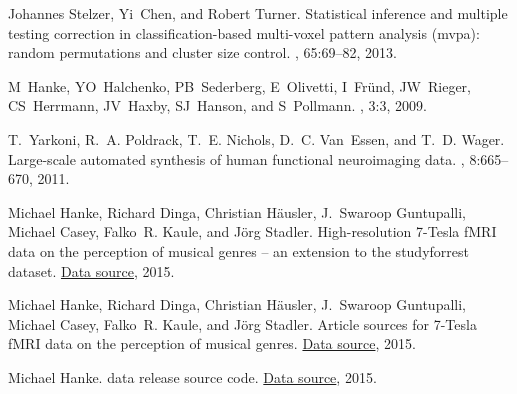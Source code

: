 \documentclass[10pt,a4paper,twocolumn]{article}
\begin{document}
\begin{thebibliography}{10}
Johannes Stelzer, Yi~Chen, and Robert Turner.
\newblock Statistical inference and multiple testing correction in
  classification-based multi-voxel pattern analysis (mvpa): random permutations
  and cluster size control.
, 65:69--82, 2013.

M~Hanke, YO~Halchenko, PB~Sederberg, E~Olivetti, I~Fründ, JW~Rieger,
  CS~Herrmann, JV~Haxby, SJ~Hanson, and S~Pollmann.
, 3:3, 2009.

T.~Yarkoni, R.~A. Poldrack, T.~E. Nichols, D.~C. Van~Essen, and T.~D. Wager.
\newblock Large-scale automated synthesis of human functional neuroimaging
  data.
, 8:665--670, 2011.

Michael Hanke, Richard Dinga, Christian H\"ausler, J.~Swaroop Guntupalli,
  Michael Casey, Falko~R. Kaule, and J\"org Stadler.
\newblock High-resolution {7-Tesla fMRI} data on the perception of musical
  genres -- an extension to the studyforrest dataset.
\newblock \href{http://openfmri.org/dataset/ds000113b}{Data source}, 2015.

Michael Hanke, Richard Dinga, Christian H\"ausler, J.~Swaroop Guntupalli,
  Michael Casey, Falko~R. Kaule, and J\"org Stadler.
\newblock Article sources for {7-Tesla fMRI} data on the perception of musical
  genres.
\newblock \href{http://dx.doi.org/10.5281/zenodo.18767}{Data source}, 2015.

Michael Hanke.
 data release source code.
\newblock \href{http://dx.doi.org/10.5281/zenodo.18770}{Data source}, 2015.

\end{thebibliography}
\end{document}
